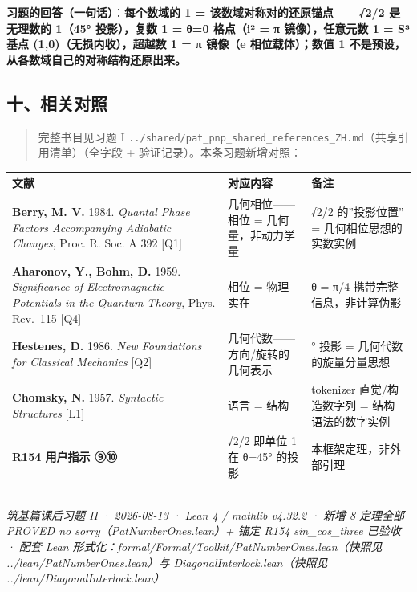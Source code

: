 \documentclass[
]{article}
\newcounter{none} %
\begin{document}
\textbf{习题的回答（一句话）}：\textbf{每个数域的 1 =
该数域对称对的还原锚点------√2/2 是无理数的 1（45° 投影），复数 1 = θ=0
格点（i² = π 镜像），任意元数 1 = S³ 基点 (1,0)（无损内收），超越数 1 =
π 镜像（e 相位载体）；数值 1 不是预设，从各数域自己的对称结构还原出来。}

\subsection{十、相关对照}\label{ux5341ux76f8ux5173ux5bf9ux7167}

\begin{quote}
完整书目见习题 I
\texttt{../shared/pat\_pnp\_shared\_references\_ZH.md}（共享引用清单）（全字段
+ 验证记录）。本条习题新增对照：
\end{quote}

{\def\LTcaptype{none} %
\begin{longtable}[]{@{}
  >{\raggedright\arraybackslash}p{}
  >{\raggedright\arraybackslash}p{}
  >{\raggedright\arraybackslash}p{}@{}}
\toprule\noalign{}
\begin{minipage}[b]{\linewidth}\raggedright
文献
\end{minipage} & \begin{minipage}[b]{\linewidth}\raggedright
对应内容
\end{minipage} & \begin{minipage}[b]{\linewidth}\raggedright
备注
\end{minipage} \\
\midrule\noalign{}
\endhead
\bottomrule\noalign{}
\endlastfoot
\textbf{Berry, M. V.} 1984. \emph{Quantal Phase Factors Accompanying
Adiabatic Changes}, Proc. R. Soc. A 392 {[}Q1{]} & 几何相位------相位 =
几何量，非动力学量 & √2/2 的''投影位置'' = 几何相位思想的实数实例 \\
\textbf{Aharonov, Y., Bohm, D.} 1959. \emph{Significance of
Electromagnetic Potentials in the Quantum Theory}, Phys. Rev.~115
{[}Q4{]} & 相位 = 物理实在 & θ = π/4 携带完整信息，非计算伪影 \\
\textbf{Hestenes, D.} 1986. \emph{New Foundations for Classical
Mechanics} {[}Q2{]} & 几何代数------方向/旋转的几何表示 & 45° 投影 =
几何代数的旋量分量思想 \\
\textbf{Chomsky, N.} 1957. \emph{Syntactic Structures} {[}L1{]} & 语言 =
结构 & tokenizer 直觉/构造数字列 = 结构语法的数字实例 \\
\textbf{R154 用户指示 ⑨⑩} & √2/2 即单位 1 在 θ=45° 的投影 &
本框架定理，非外部引理 \\
\end{longtable}
}

\begin{center}\rule{0.5\linewidth}{0.5pt}\end{center}

\emph{筑基篇课后习题 II · 2026-08-13 · Lean 4 / mathlib v4.32.2 · 新增 8
定理全部 PROVED no sorry（PatNumberOnes.lean）+ 锚定 R154
sin\_cos\_three 已验收 · 配套 Lean
形式化：formal/Formal/Toolkit/PatNumberOnes.lean（快照见
../lean/PatNumberOnes.lean）与 DiagonalInterlock.lean（快照见
../lean/DiagonalInterlock.lean）}
\end{document}
